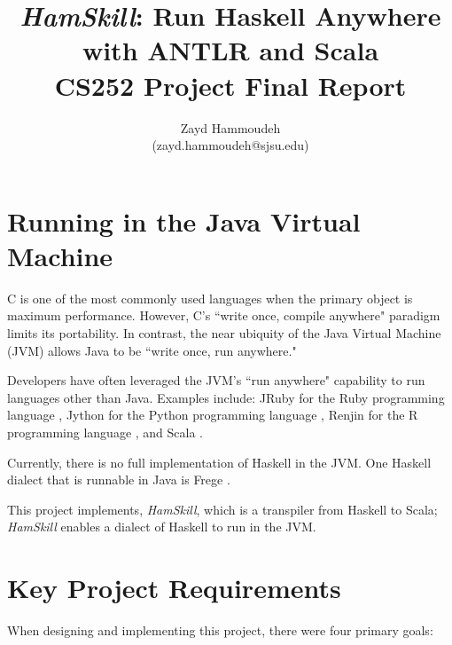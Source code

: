 \documentclass{report}
\title{\emph{HamSkill}: Run Haskell Anywhere \\
with ANTLR and Scala\\[1in]
	   CS252 Project Final Report}
\author{
  Zayd Hammoudeh \\
  (zayd.hammoudeh@sjsu.edu)
  }
\begin{document}
\maketitle


\tableofcontents{\protect\newpage}

\listoffigures
\newpage
 

\renewcommand\thesection{\arabic{section}}

\section{Running in the Java Virtual Machine}\label{sec:jvm}

C is one of the most commonly used languages when the primary object is maximum performance.  However, C's ``write once, compile anywhere" paradigm limits its portability.  In contrast, the near ubiquity of the Java Virtual Machine (JVM) allows Java to be ``write once, run anywhere."  

Developers have often leveraged the JVM's ``run anywhere" capability to run languages other than Java.  Examples include: JRuby for the Ruby programming language \cite{jruby}, Jython for the Python programming language \cite{jython_jvm}, Renjin for the R programming language \cite{renjin}, and Scala \cite{scala}.

Currently, there is no full implementation of Haskell in the JVM.  One Haskell dialect that is runnable in Java is Frege \cite{frege}.  

This project implements, \emph{HamSkill}, which is a transpiler from Haskell to Scala; \textit{HamSkill} enables a dialect of Haskell to run in the JVM.  

\section{Key Project Requirements}\label{sec:keyProjectRequirements}

When designing and implementing this project, there were four primary goals:
\end{document}
